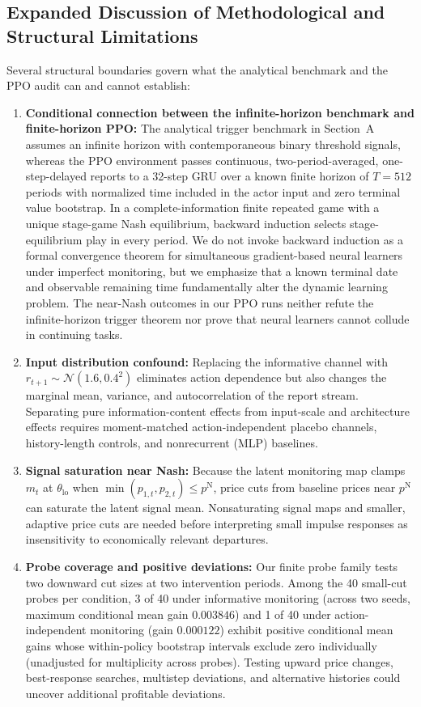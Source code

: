 \documentclass{article}
\begin{document}
\subsection{Expanded Discussion of Methodological and Structural Limitations}

Several structural boundaries govern what the analytical benchmark and the PPO audit can and cannot establish:
\begin{enumerate}
\item \textbf{Conditional connection between the infinite-horizon benchmark and finite-horizon PPO:} The analytical trigger benchmark in Section~A assumes an infinite horizon with contemporaneous binary threshold signals, whereas the PPO environment passes continuous, two-period-averaged, one-step-delayed reports to a 32-step GRU over a known finite horizon of $T=512$ periods with normalized time included in the actor input and zero terminal value bootstrap. In a complete-information finite repeated game with a unique stage-game Nash equilibrium, backward induction selects stage-equilibrium play in every period. We do not invoke backward induction as a formal convergence theorem for simultaneous gradient-based neural learners under imperfect monitoring, but we emphasize that a known terminal date and observable remaining time fundamentally alter the dynamic learning problem. The near-Nash outcomes in our PPO runs neither refute the infinite-horizon trigger theorem nor prove that neural learners cannot collude in continuing tasks.
\item \textbf{Input distribution confound:} Replacing the informative channel with $r_{t+1}\sim\mathcal{N}(1.6,0.4^2)$ eliminates action dependence but also changes the marginal mean, variance, and autocorrelation of the report stream. Separating pure information-content effects from input-scale and architecture effects requires moment-matched action-independent placebo channels, history-length controls, and nonrecurrent (MLP) baselines.
\item \textbf{Signal saturation near Nash:} Because the latent monitoring map clamps $m_t$ at $\theta_{\mathrm{lo}}$ when $\min(p_{1,t},p_{2,t})\leq p^{\mathrm{N}}$, price cuts from baseline prices near $p^{\mathrm{N}}$ can saturate the latent signal mean. Nonsaturating signal maps and smaller, adaptive price cuts are needed before interpreting small impulse responses as insensitivity to economically relevant departures.
\item \textbf{Probe coverage and positive deviations:} Our finite probe family tests two downward cut sizes at two intervention periods. Among the 40 small-cut probes per condition, 3 of 40 under informative monitoring (across two seeds, maximum conditional mean gain $0.003846$) and 1 of 40 under action-independent monitoring (gain $0.000122$) exhibit positive conditional mean gains whose within-policy bootstrap intervals exclude zero individually (unadjusted for multiplicity across probes). Testing upward price changes, best-response searches, multistep deviations, and alternative histories could uncover additional profitable deviations.

\end{enumerate}
\end{document}
